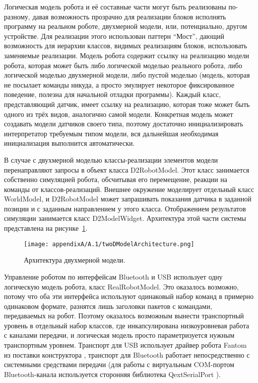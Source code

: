 Логическая модель робота и её составные части могут быть реализованы по-разному, давая 
возможность прозрачно для реализации блоков исполнять программу на реальном роботе, 
двухмерной модели, или, потенциально, другом устройстве. Для реализации этого использован 
паттерн "`Мост"', дающий возможность для иерархии классов, видимых реализациям блоков, 
использовать заменяемые реализации. Модель робота содержит ссылку на реализацию модели 
робота, которая может быть либо логической моделью реального робота, либо логической 
моделью двухмерной модели, либо пустой моделью (модель, которая не посылает команды 
никуда, а просто эмулирует некоторое фиксированное поведение, полезна для начальной 
отладки программы). Каждый класс, представляющий датчик, имеет ссылку на реализацию, 
которая тоже может быть одного из трёх видов, аналогично самой модели. Конкретная 
модель может создавать модели датчиков своего типа, поэтому достаточно инициализировать 
интерпретатор требуемым типом модели, вся дальнейшая необходимая инициализация выполнится 
автоматически.

В случае с двухмерной моделью классы-реализации элементов модели перенаправляют запросы 
в объект класса D2RobotModel. Этот класс занимается собственно симуляцией робота, 
обсчитывая его перемещение, реакции на команды от классов-реализаций. Внешнее окружение 
моделирует отдельный класс WorldModel, и D2RobotModel может запрашивать показания 
датчика в заданной позиции и с заданным направлением у этого класса. Отображением 
результатов симуляции занимается класс D2ModelWidget. Архитектура этой части системы 
представлена на рисунке~\ref{image:twoDModelArchitecture}.

\begin{figure} [ht]
	\begin{center}
		\texttt{[image: appendixA/A.1/twoDModelArchitecture.png]}
		\caption{Архитектура двухмерной модели.}
		\label{image:twoDModelArchitecture}
	\end{center}
\end{figure}

Управление роботом по интерфейсам Bluetooth и USB использует одну логическую модель 
робота, класс RealRobotModel. Это оказалось возможно, потому что оба эти интерфейса 
используют одинаковый набор команд в примерно одинаковом формате, разнятся лишь заголовки 
пакетов с командами, передаваемых на робот. Поэтому оказалось возможным вынести транспортный 
уровень в отдельный набор классов, где инкапсулирована низкоуровневая работа с каналами 
передачи, и логическая модель просто параметризуется нужным транспортным уровнем. 
Транспорт для USB использует драйвер робота Fantom из поставки конструктора%
, транспорт для Bluetooth работает непосредственно с системными средствами передачи 
(для работы с виртуальным COM-портом Bluetooth-канала используется сторонняя библиотека 
QextSerialPort%
).

